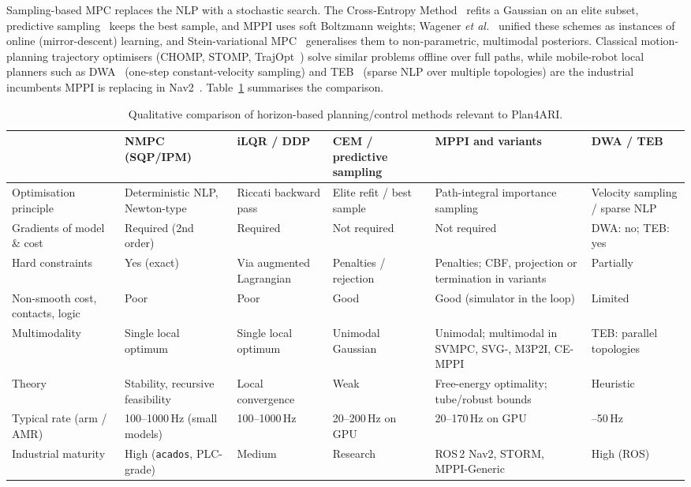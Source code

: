 Sampling-based MPC replaces the NLP with a stochastic search. The Cross-Entropy Method~\cite{rubinstein1999cem,pinneri2020icem} refits a Gaussian on an elite subset, predictive sampling~\cite{howell2022predictivesampling} keeps the best sample, and MPPI uses soft Boltzmann weights; Wagener \emph{et al.}~\cite{wagener2019dmd} unified these schemes as instances of online (mirror-descent) learning, and Stein-variational MPC~\cite{lambert2020svmpc} generalises them to non-parametric, multimodal posteriors. Classical motion-planning trajectory optimisers (CHOMP, STOMP, TrajOpt~\cite{zucker2013chomp,kalakrishnan2011stomp,schulman2014trajopt}) solve similar problems offline over full paths, while mobile-robot local planners such as DWA~\cite{fox1997dwa} (one-step constant-velocity sampling) and TEB~\cite{rosmann2017teb} (sparse NLP over multiple topologies) are the industrial incumbents MPPI is replacing in Nav2~\cite{macenski2023nav2survey}. Table~\ref{tab:cmp} summarises the comparison.

\begin{table}[t]
\centering\small
\caption{Qualitative comparison of horizon-based planning/control methods relevant to Plan4ARI.}\label{tab:cmp}
\setlength{\tabcolsep}{4pt}
\begin{tabularx}{\textwidth}{@{}>{\raggedright}p{2.3cm}>{\raggedright}X>{\raggedright}X>{\raggedright}X>{\raggedright}X>{\raggedright\arraybackslash}X@{}}
\toprule
 & \textbf{NMPC (SQP/IPM)} & \textbf{iLQR / DDP} & \textbf{CEM / predictive sampling} & \textbf{MPPI and variants} & \textbf{DWA / TEB} \\
\midrule
Optimisation principle & Deterministic NLP, Newton-type & Riccati backward pass & Elite refit / best sample & Path-integral importance sampling & Velocity sampling / sparse NLP \\
Gradients of model \& cost & Required (2nd order) & Required & Not required & Not required & DWA: no; TEB: yes \\
Hard constraints & Yes (exact) & Via augmented Lagrangian & Penalties / rejection & Penalties; CBF, projection or termination in variants & Partially \\
Non-smooth cost, contacts, logic & Poor & Poor & Good & Good (simulator in the loop) & Limited \\
Multimodality & Single local optimum & Single local optimum & Unimodal Gaussian & Unimodal; multimodal in SVMPC, SVG-, M3P2I, CE-MPPI & TEB: parallel topologies \\
Theory & Stability, recursive feasibility & Local convergence & Weak & Free-energy optimality; tube/robust bounds~\cite{gandhi2021rmppi} & Heuristic \\
Typical rate (arm / AMR) & 100--1000\,Hz (small models) & 100--1000\,Hz & 20--200\,Hz on GPU & 20--170\,Hz on GPU & 10--50\,Hz \\
Industrial maturity & High (\texttt{acados}, PLC-grade) & Medium & Research & ROS\,2 Nav2, STORM, MPPI-Generic & High (ROS) \\
\bottomrule
\end{tabularx}
\end{table}

